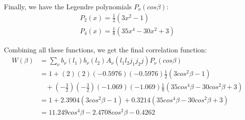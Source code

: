 \documentclass[onecolumn, a4paper, oneside, article, 12pt]{article}
\begin{document}
Finally, we have the Legendre polynomials $P_\nu(cos\beta)$:
\begin{gather*}
	P_2(x) = \frac{1}{2}(3x^2 - 1) \\
	P_4(x) = \frac{1}{8}(35x^4 - 30x^2 + 3)
\end{gather*}

Combining all these functions, we get the final correlation function: 
\begin{align*}
	W(\beta) &= \sum_\nu b_\nu(l_1) b_\nu(l_2) A_\nu(l_1 l_2 j_1 j_2 j) P_\nu(cos\beta) \\
	&=  1 + (2)(2)(-0.5976)(-0.5976)\frac{1}{2}(3cos^2\beta - 1) \\
	&\ \ \ \ + (-\frac{3}{2})(-\frac{3}{2})(-1.069)(-1.069)\frac{1}{8}(35cos^4\beta - 30cos^2\beta + 3) \\
	&= 1 + 2.3904(3cos^2\beta - 1) + 0.3214(35cos^4\beta - 30cos^2\beta + 3) \\
	&= 11.249cos^4\beta - 2.4708cos^2\beta - 0.4262
\end{align*}
\end{document}
